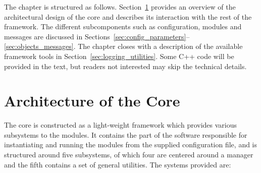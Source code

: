 The chapter is structured as follows.
Section~\ref{sec:arch} provides an overview of the architectural design of the core and describes its interaction with the rest of the \apsq framework.
The different subcomponents such as configuration, modules and messages are discussed in Sections~\ref{sec:config_parameters}--\ref{sec:objects_messages}.
The chapter closes with a description of the available framework tools in Section~\ref{sec:logging_utilities}.
Some C++ code will be provided in the text, but readers not interested may skip the technical details.

\section{Architecture of the Core}
\label{sec:arch}
The core is constructed as a light-weight framework which provides various subsystems to the modules.
It contains the part of the software responsible for instantiating and running the modules from the supplied configuration file, and is structured around five subsystems, of which four are centered around a manager and the fifth contains a set of general utilities.
The systems provided are:
